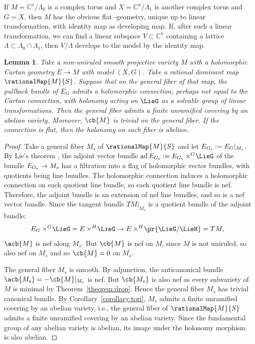 \documentclass[10pt,a4paper]{amsart}
\providecommand{\C}{}
\numberwithin{equation}{section}
\newtheorem{Lemma}[Theorem]{Lemma}
\renewcommand{\C}{\mathbb{C}}
\DeclareMathOperator{\ad}{ad}
\newcommand{\amal}[3]{\ensuremath{{#1} \mathbin{\times^{#2}} \! #3}}
\begin{document}
\begin{Example}
If $M = \C^{n}/\Lambda_0$ is a complex torus and $X = \C^{n}/\Lambda_1$ is another complex torus and $G = X$, then $M$ has the obvious flat -geometry, unique up to linear transformation, with identity map as developing map.
If, after such a linear transformation, we can find a linear subspace $V \subset \C^{n}$ containing a
lattice $\Lambda \subset \Lambda_0 \cap \Lambda_1$, then $V/\Lambda$ develops to the model by the identity map.
\end{Example}

\begin{Lemma}\label{lemma:abelian.pancake}
Take a non-uniruled smooth projective variety $M$ with a holomorphic Cartan geometry $E \to M$ with model $(X, G)$.
Take a rational dominant map $\rationalMap{M}{S}$.
Suppose that on the general fiber of that map, the pullback bundle of $E_G$ admits a holomorphic connection, perhaps not equal to the Cartan connection, with holonomy acting on $\LieG$ as a solvable group of linear transformations.
Then the general fiber admits a finite unramified covering by an abelian variety.
Moreover, $\cb{M}$ is trivial on the general fiber.
If the connection is flat, then the holonomy on each fiber is abelian.
\end{Lemma}

\begin{proof}
Take a general fiber $M_{s} $ of $\rationalMap{M}{S}$ and let $E_{G_{\rm s} } := E_G|_{M_{s} }$.
By Lie's theorem \cite[Theorem 3]{Serre:2001}, the adjoint vector bundle $\ad{E_{G_{\rm s} }} := \amal{E_{G_{\rm s}}}{G}{\LieG}$ of the bundle $E_{G_{\rm s} }
\to M_{s} $ has a filtration into a flag of holomorphic vector bundles, with quotients being line bundles.
The holomorphic connection induces a holomorphic connection on each quotient line bundle, so each quotient line bundle is nef.
Therefore, the adjoint bundle is an extension of nef line bundles, and so is a nef vector bundle.
Since the tangent bundle $TM|_{M_{s} }$ is a quotient bundle of the adjoint bundle:
\[
\amal{E_G}{G}{\LieG} = \amal{E}{H}{\LieG} \to \amal{E}{H}{\pr{\LieG/\LieH}} = TM,
\]
$\acb{M}$ is nef along $M_{s} $.
But $\cb{M}$ is nef on $M$, since $M$ is not uniruled, so also nef on $M_{s} $ and so $\cb{M} = 0$ on $M_{s} $.

The general fiber $M_{s} $ is smooth.
By adjunction, the anticanonical bundle $\acb{M_{s}} = - \cb{M} |_{M_{s}}$ is nef.
But $\cb{M_{s}}$ is also nef as every subvariety of $M$ is minimal by Theorem~\ref{theorem:drop}.
Hence the general fiber $M_{s}$ has trivial canonical bundle.
By Corollary~\ref{corollary:tori}, $M_{s}$ admits a finite unramified covering by an abelian variety, i.e., the general fiber of $\rationalMap{M}{S}$ admits a finite unramified covering by an abelian variety.
Since the fundamental group of any abelian variety is abelian, its image under the holonomy morphism is also abelian.
\end{proof}
\end{document}
